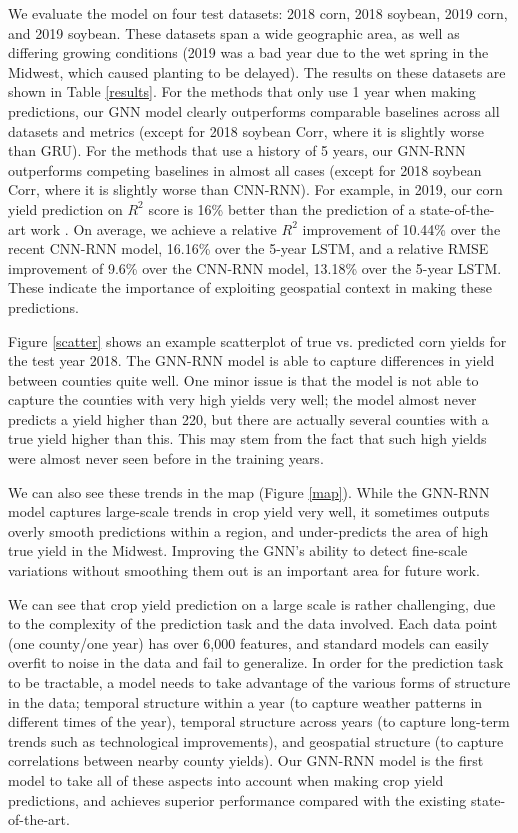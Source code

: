We evaluate the model on four test datasets: 2018 corn, 2018 soybean, 2019 corn, and 2019 soybean. These datasets span a wide geographic area, as well as differing growing conditions (2019 was a bad year due to the wet spring in the Midwest, which caused planting to be delayed). The results on these datasets are shown in Table \ref{results}. For the methods that only use 1 year when making predictions, our GNN model clearly outperforms comparable baselines across all datasets and metrics (except for 2018 soybean Corr, where it is slightly worse than GRU). For the methods that use a history of 5 years, our GNN-RNN outperforms competing baselines in almost all cases (except for 2018 soybean Corr, where it is slightly worse than CNN-RNN). For example, in 2019, our corn yield prediction on $R^2$ score is 16\% better than the prediction of a state-of-the-art work \cite{khaki2020cnn}. On average, we achieve a relative $R^2$ improvement of 10.44\% over the recent CNN-RNN model, 16.16\% over the 5-year LSTM, and a relative RMSE improvement of 9.6\% over the CNN-RNN model, 13.18\% over the 5-year LSTM.  These indicate the importance of exploiting geospatial context in making these predictions.




Figure \ref{scatter} shows an example scatterplot of true vs. predicted corn yields for the test year 2018. The GNN-RNN model is able to capture differences in yield between counties quite well. One minor issue is that the model is not able to capture the counties with very high yields very well; the model almost never predicts a yield higher than 220, but there are actually several counties with a true yield higher than this. This may stem from the fact that such high yields were almost never seen before in the training years. %

We can also see these trends in the map (Figure \ref{map}). While the GNN-RNN model captures large-scale trends in crop yield very well, it sometimes outputs overly smooth predictions within a region, and under-predicts the area of high true yield in the Midwest. Improving the GNN's ability to detect fine-scale variations without smoothing them out is an important area for future work. 

We can see that crop yield prediction on a large scale is rather challenging, due to the complexity of the prediction task and the data involved. Each data point (one county/one year) has over 6,000 features, and standard models can easily overfit to noise in the data and fail to generalize. In order for the prediction task to be tractable, a model needs to take advantage of the various forms of structure in the data; temporal structure within a year (to capture weather patterns in different times of the year), temporal structure across years (to capture long-term trends such as technological improvements), and geospatial structure (to capture correlations between nearby county yields).  Our GNN-RNN model is the first model to take all of these aspects into account when making crop yield predictions, and achieves superior performance compared with the existing state-of-the-art. 

